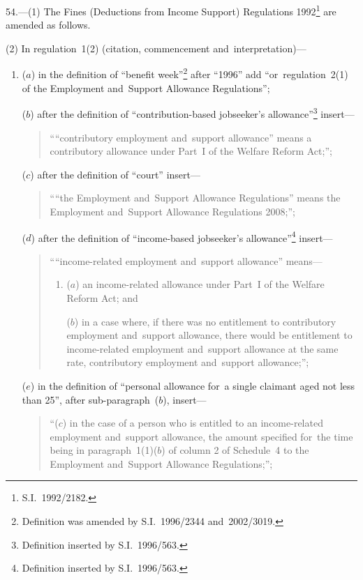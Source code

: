 \documentclass[12pt,a4paper]{article}
\begin{document}
54.---(1)  The Fines (Deductions from Income Support) Regulations 1992\footnote{S.I.~1992/2182.} are amended as follows.

(2) In regulation~1(2) (citation, commencement and~interpretation)—
\begin{enumerate}\item[]
($a$) in the definition of “benefit week”\footnote{Definition was amended by S.I.~1996/2344 and~2002/3019.} after “1996” add “or~regulation~2(1) of the Employment and~Support Allowance Regulations”;

($b$) after the definition of “contribution-based jobseeker’s allowance”\footnote{Definition inserted by S.I.~1996/563.} insert—
\begin{quotation}
““contributory employment and~support allowance” means a contributory allowance under Part~I of the Welfare Reform Act;”;
\end{quotation}

($c$) after the definition of “court” insert—
\begin{quotation}
““the Employment and~Support Allowance Regulations” means the Employment and~Support Allowance Regulations 2008;”;
\end{quotation}

($d$) after the definition of “income-based jobseeker’s allowance”\footnote{Definition inserted by S.I.~1996/563.} insert—
\begin{quotation}
\begin{sloppypar}
““income-related employment and~support allowance” means—
\end{sloppypar}
\begin{enumerate}\item[]
($a$) 
an income-related allowance under Part~I of the Welfare Reform Act; and

($b$) 
in a case where, if there was no entitlement to contributory employment and~support allowance, there would be entitlement to income-related employment and~support allowance at the same rate, contributory employment and~support allowance;”;
\end{enumerate}
\end{quotation}

($e$) in the definition of “personal allowance for~a single claimant aged not less than 25”, after sub-paragraph~($b$), insert—
\begin{quotation}
“($c$) in the case of a person who is entitled to an income-related employment and~support allowance, the amount specified for~the time being in paragraph~1(1)($b$)  of column 2 of Schedule~4 to the Employment and~Support Allowance Regulations;”;
\end{quotation}


\end{enumerate}
\end{document}
